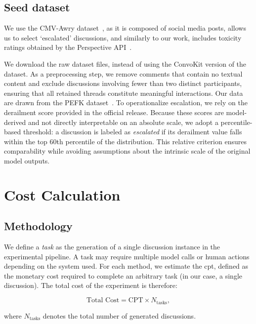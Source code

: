 \subsection{Seed dataset}
\label{sec:appendix:replication:preprocessing}

We use the CMV-Awry dataset~\cite{chang-danescu-niculescu-mizil-2019-trouble}, as it is composed of social media posts, allows us to select `escalated' discussions, and similarly to our work, includes toxicity ratings obtained by the Perspective API~\cite{google_perspective_api}.

We download the raw dataset files, instead of using the ConvoKit version of the dataset. As a preprocessing step, we remove comments that contain no textual content and exclude discussions involving fewer than two distinct participants, ensuring that all retained threads constitute meaningful interactions. Our data are drawn from the PEFK dataset~\cite{tsirmpas2025pefk}. To operationalize escalation, we rely on the derailment score provided in the official release. Because these scores are model-derived and not directly interpretable on an absolute scale, we adopt a percentile-based threshold: a discussion is labeled as \emph{escalated} if its derailment value falls within the top 60th percentile of the distribution. This relative criterion ensures comparability while avoiding assumptions about the intrinsic scale of the original model outputs.


\section{Cost Calculation}
\label{sec:appendix:cost}

\subsection{Methodology}
\label{sec:appendix:cost:methodology}

We define a \textit{task} as the generation of a single discussion instance in the experimental pipeline. A task may require multiple model calls or human actions depending on the system used. For each method, we estimate the \acf{cpt}, defined as the monetary cost required to complete an arbitrary task (in our case, a single discussion). The total cost of the experiment is therefore:

\[
\text{Total Cost} = \text{CPT} \times N_{\text{tasks}},
\]

where $N_{\text{tasks}}$ denotes the total number of generated discussions.

